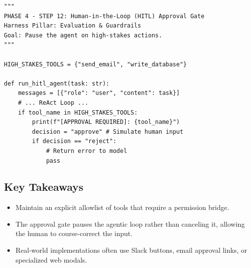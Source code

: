\begin{lstlisting}[caption={step12\_hitl\_agent.py}, label={lst:step12}]
"""
PHASE 4 - STEP 12: Human-in-the-Loop (HITL) Approval Gate
Harness Pillar: Evaluation & Guardrails
Goal: Pause the agent on high-stakes actions.
"""

HIGH_STAKES_TOOLS = {"send_email", "write_database"}

def run_hitl_agent(task: str):
    messages = [{"role": "user", "content": task}]
    # ... ReAct Loop ...
    if tool_name in HIGH_STAKES_TOOLS:
        print(f"[APPROVAL REQUIRED]: {tool_name}")
        decision = "approve" # Simulate human input
        if decision == "reject":
            # Return error to model
            pass
\end{lstlisting}

\subsection*{Key Takeaways}
\begin{itemize}
    \item Maintain an explicit allowlist of tools that require a permission bridge.
    \item The approval gate pauses the agentic loop rather than canceling it, allowing the human to course-correct the input.
    \item Real-world implementations often use Slack buttons, email approval links, or specialized web modals.
\end{itemize}
